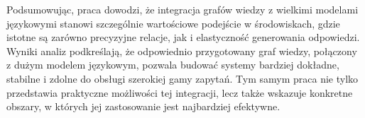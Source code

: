 \documentclass[
a4paper,
12pt,
]{article}
\begin{document}
Podsumowując, praca dowodzi, że integracja grafów wiedzy z wielkimi modelami językowymi stanowi szczególnie wartościowe podejście w środowiskach, gdzie istotne są zarówno precyzyjne relacje, jak i elastyczność generowania odpowiedzi. Wyniki analiz podkreślają, że odpowiednio przygotowany graf wiedzy, połączony z dużym modelem językowym, pozwala budować systemy bardziej dokładne, stabilne i zdolne do obsługi szerokiej gamy zapytań. Tym samym praca nie tylko przedstawia praktyczne możliwości tej integracji, lecz także wskazuje konkretne obszary, w których jej zastosowanie jest najbardziej efektywne.


\newpage
\clearpage\newpage


\printbibliography[
heading=bibintoc,
]{}

\end{document}
